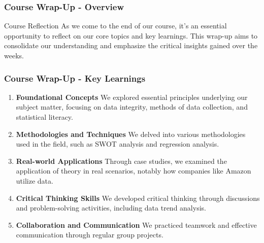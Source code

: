 \documentclass[aspectratio=169]{beamer}
\begin{document}
\frame{\titlepage}

\begin{frame}[fragile]
    \frametitle{Course Wrap-Up - Overview}
    \begin{block}{Course Reflection}
        As we come to the end of our course, it's an essential opportunity to reflect on our core topics and key learnings. This wrap-up aims to consolidate our understanding and emphasize the critical insights gained over the weeks.
    \end{block}
\end{frame}

\begin{frame}[fragile]
    \frametitle{Course Wrap-Up - Key Learnings}
    \begin{enumerate}
        \item \textbf{Foundational Concepts}  
        We explored essential principles underlying our subject matter, focusing on data integrity, methods of data collection, and statistical literacy.
        
        \item \textbf{Methodologies and Techniques}  
        We delved into various methodologies used in the field, such as SWOT analysis and regression analysis.
        
        \item \textbf{Real-world Applications}  
        Through case studies, we examined the application of theory in real scenarios, notably how companies like Amazon utilize data.
        
        \item \textbf{Critical Thinking Skills}  
        We developed critical thinking through discussions and problem-solving activities, including data trend analysis.
        
        \item \textbf{Collaboration and Communication}  
        We practiced teamwork and effective communication through regular group projects.
    \end{enumerate}
\end{frame}
\end{document}
